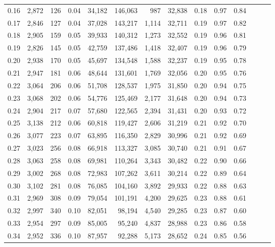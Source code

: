 \begin{tabular}{rrrrrrrrrrrrrr}
0.16 &  2,872 &  126 &  0.04 &   34,182 &  146,063 &     987 &  32,838 &  0.18 &  0.97 &      0.84 \\
0.17 &  2,846 &  127 &  0.04 &   37,028 &  143,217 &   1,114 &  32,711 &  0.19 &  0.97 &      0.82 \\
0.18 &  2,905 &  159 &  0.05 &   39,933 &  140,312 &   1,273 &  32,552 &  0.19 &  0.96 &      0.81 \\
0.19 &  2,826 &  145 &  0.05 &   42,759 &  137,486 &   1,418 &  32,407 &  0.19 &  0.96 &      0.79 \\
0.20 &  2,938 &  170 &  0.05 &   45,697 &  134,548 &   1,588 &  32,237 &  0.19 &  0.95 &      0.78 \\
0.21 &  2,947 &  181 &  0.06 &   48,644 &  131,601 &   1,769 &  32,056 &  0.20 &  0.95 &      0.76 \\
0.22 &  3,064 &  206 &  0.06 &   51,708 &  128,537 &   1,975 &  31,850 &  0.20 &  0.94 &      0.75 \\
0.23 &  3,068 &  202 &  0.06 &   54,776 &  125,469 &   2,177 &  31,648 &  0.20 &  0.94 &      0.73 \\
0.24 &  2,904 &  217 &  0.07 &   57,680 &  122,565 &   2,394 &  31,431 &  0.20 &  0.93 &      0.72 \\
0.25 &  3,138 &  212 &  0.06 &   60,818 &  119,427 &   2,606 &  31,219 &  0.21 &  0.92 &      0.70 \\
0.26 &  3,077 &  223 &  0.07 &   63,895 &  116,350 &   2,829 &  30,996 &  0.21 &  0.92 &      0.69 \\
0.27 &  3,023 &  256 &  0.08 &   66,918 &  113,327 &   3,085 &  30,740 &  0.21 &  0.91 &      0.67 \\
0.28 &  3,063 &  258 &  0.08 &   69,981 &  110,264 &   3,343 &  30,482 &  0.22 &  0.90 &      0.66 \\
0.29 &  3,002 &  268 &  0.08 &   72,983 &  107,262 &   3,611 &  30,214 &  0.22 &  0.89 &      0.64 \\
0.30 &  3,102 &  281 &  0.08 &   76,085 &  104,160 &   3,892 &  29,933 &  0.22 &  0.88 &      0.63 \\
0.31 &  2,969 &  308 &  0.09 &   79,054 &  101,191 &   4,200 &  29,625 &  0.23 &  0.88 &      0.61 \\
0.32 &  2,997 &  340 &  0.10 &   82,051 &   98,194 &   4,540 &  29,285 &  0.23 &  0.87 &      0.60 \\
0.33 &  2,954 &  297 &  0.09 &   85,005 &   95,240 &   4,837 &  28,988 &  0.23 &  0.86 &      0.58 \\
0.34 &  2,952 &  336 &  0.10 &   87,957 &   92,288 &   5,173 &  28,652 &  0.24 &  0.85 &      0.56 \\

\end{tabular}
